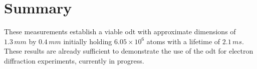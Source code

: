 \section{Summary}

These measurements establish a viable \gls{odt} with approximate dimensions of $1.3\,\unit{mm}$ by $0.4\,\unit{mm}$ initially holding $6.05\times10^6$ atoms with a lifetime of $2.1\,\unit{ms}$. These results are already sufficient to demonstrate the use of the \gls{odt} for electron diffraction experiments, currently in progress.
